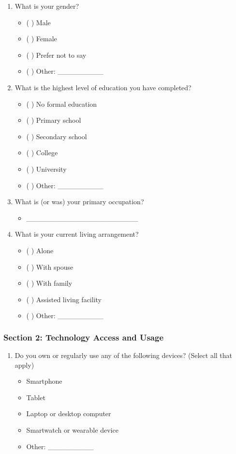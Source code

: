 \documentclass[acmlarge]{acmart}
\begin{document}
{\begin{enumerate}
    \item What is your gender?
    \begin{itemize}
        \item ( ) Male
        \item ( ) Female
        \item ( ) Prefer not to say
        \item ( ) Other: \_\_\_\_\_\_\_\_\_
    \end{itemize}
    
    \item What is the highest level of education you have completed?
    \begin{itemize}
        \item ( ) No formal education
        \item ( ) Primary school
        \item ( ) Secondary school
        \item ( ) College
        \item ( ) University
        \item ( ) Other: \_\_\_\_\_\_\_\_\_
    \end{itemize}
    
    \item What is (or was) your primary occupation?
    \begin{itemize}
        \item \_\_\_\_\_\_\_\_\_\_\_\_\_\_\_\_\_\_\_\_\_\_
    \end{itemize}
    
    \item What is your current living arrangement?
    \begin{itemize}
        \item ( ) Alone
        \item ( ) With spouse
        \item ( ) With family
        \item ( ) Assisted living facility
        \item ( ) Other: \_\_\_\_\_\_\_\_\_
    \end{itemize}
\end{enumerate}

\subsubsection{Section 2: Technology Access and Usage}
\begin{enumerate}
    \item Do you own or regularly use any of the following devices? (Select all that apply)
    \begin{itemize}
        \item Smartphone
        \item Tablet
        \item Laptop or desktop computer
        \item Smartwatch or wearable device
        \item Other: \_\_\_\_\_\_\_\_\_
    \end{itemize}
    

\end{enumerate}}
\end{document}

